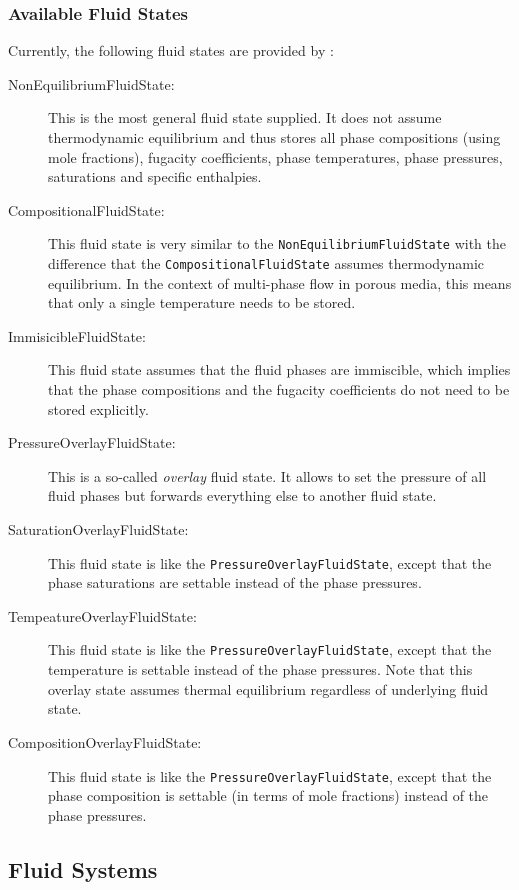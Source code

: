 \subsubsection{Available Fluid States}
Currently, the following fluid states are provided by \Dumux:
\begin{description}
\item[NonEquilibriumFluidState:] This is the most general fluid state
  supplied. It does not assume thermodynamic equilibrium and thus
  stores all phase compositions (using mole fractions), fugacity
  coefficients, phase temperatures, phase pressures, saturations and
  specific enthalpies.
\item[CompositionalFluidState:] This fluid state is very similar to
  the \texttt{Non\-Equilibrium\-Fluid\-State} with the difference that
  the \texttt{Compositional\-Fluid\-State} assumes thermodynamic
  equilibrium. In the context of multi-phase flow in porous media,
  this means that only a single temperature needs to be stored.
\item[ImmisicibleFluidState:] This fluid state assumes that the fluid
  phases are immiscible, which implies that the phase compositions and
  the fugacity coefficients do not need to be stored explicitly.
\item[PressureOverlayFluidState:] This is a so-called {\em overlay}
  fluid state. It allows to set the pressure of all fluid phases but
  forwards everything else to another fluid state.
\item[SaturationOverlayFluidState:] This fluid state is like the
  \texttt{PressureOverlayFluidState}, except that the phase
  saturations are settable instead of the phase pressures.
\item[TempeatureOverlayFluidState:] This fluid state is like the
  \texttt{PressureOverlayFluidState}, except that the temperature is
  settable instead of the phase pressures. Note that this overlay
  state assumes thermal equilibrium regardless of underlying fluid
  state.
\item[CompositionOverlayFluidState:] This fluid state is like the
  \texttt{PressureOverlayFluidState}, except that the phase
  composition is settable (in terms of mole fractions) instead of the
  phase pressures.
\end{description}

\subsection{Fluid Systems}

